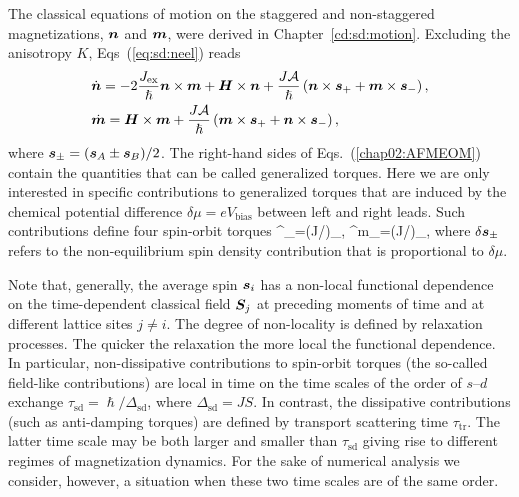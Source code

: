 The classical equations of motion on the staggered and non-staggered magnetizations, $\boldsymbol{n}$ and $\boldsymbol{m}$, were derived in Chapter~\ref{cd:sd:motion}. Excluding the anisotropy $K$, Eqs~(\ref{eq:sd:neel}) reads
\begin{align}
&\dot{\boldsymbol{n}} = -2\frac{J_\textrm{ex}}{\hslash} \boldsymbol{n}\times\boldsymbol{m} +\boldsymbol{H}\times\boldsymbol{n}+\frac{J\mathcal{A}}{\hslash}\left(\boldsymbol{n}\times\boldsymbol{s}_++\boldsymbol{m}\times\boldsymbol{s}_-\right),\nonumber\\
&\dot{\boldsymbol{m}} = \boldsymbol{H}\times\boldsymbol{m}+\frac{J\mathcal{A}}{\hslash}\left(\boldsymbol{m}\times\boldsymbol{s}_++\boldsymbol{n}\times\boldsymbol{s}_-\right),
\label{chap02:AFMEOM}
\end{align}
where $\boldsymbol{s}_\pm=(\boldsymbol{s}_A\pm\boldsymbol{s}_B)/2$. The right-hand sides of Eqs.~(\ref{chap02:AFMEOM}) contain the quantities that can be called generalized torques. Here we are only interested in specific contributions to generalized torques that are induced by the chemical potential difference $\delta\mu=eV_\textrm{bias}$ between left and right leads. Such contributions define four spin-orbit torques  
\be
\label{chap02:SOT_def}
^\ell_\pm=(J/\hslash)\times\delta{}_\pm, \quad 
{}^m_\pm=(J/\hslash)\times\delta{}_\pm,
\e
where $\delta \boldsymbol{s}_\pm$ refers to the non-equilibrium spin density contribution that is proportional to $\delta\mu$. 

Note that, generally, the average spin $\boldsymbol{s}_i$ has a non-local functional dependence on the time-dependent classical field $\boldsymbol{S}_j$ at preceding moments of time  and at different lattice sites $j\neq i$. The degree of non-locality is defined by relaxation processes. The quicker the relaxation the more local the functional dependence. In particular, non-dissipative contributions to spin-orbit torques (the so-called field-like contributions) are local in time on the time scales of the order of $s$--$d$ exchange  $\tau_\textrm{sd}=\hslash/\Delta_\text{sd}$, where $\Delta_\text{sd}=J S$. In contrast, the dissipative contributions (such as anti-damping torques) are defined by transport scattering time $\tau_\textrm{tr}$. The latter time scale may be both larger and smaller than $\tau_\textrm{sd}$ giving rise to different regimes of magnetization dynamics. For the sake of numerical analysis we consider, however, a situation when these two time scales are of the same order.


